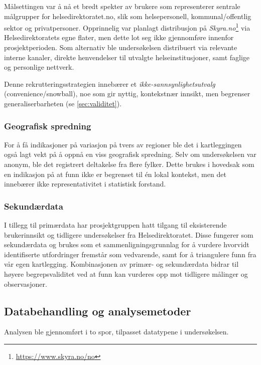 Målsettingen var å nå et bredt spekter av brukere som representerer sentrale målgrupper for helsedirektoratet.no, slik som helsepersonell, kommunal/offentlig sektor og privatpersoner. Opprinnelig var planlagt distribusjon på \textit{Skyra.no}\footnote{\url{https://www.skyra.no/no}} via Helsedirektoratets egne flater, men dette lot seg ikke gjennomføre innenfor prosjektperioden. Som alternativ ble undersøkelsen distribuert via relevante interne kanaler, direkte henvendelser til utvalgte helseinstitusjoner, samt faglige og personlige nettverk.

Denne rekrutteringsstrategien innebærer et \textit{ikke-sannsynlighetsutvalg} (convenience/snowball), noe som gir nyttig, kontekstnær innsikt, men begrenser generaliserbarheten (se \autoref{sec:validitet}).

\subsubsection{Geografisk spredning}
\label{sec:geografi}

For å få indikasjoner på variasjon på tvers av regioner ble det i kartleggingen også lagt vekt på å oppnå en viss geografisk spredning. Selv om undersøkelsen var anonym, ble det registrert deltakelse fra flere fylker. Dette brukes i hovedsak som en indikasjon på at funn ikke er begrenset til én lokal kontekst, men det innebærer ikke representativitet i statistisk forstand.

\subsubsection{Sekundærdata}
\label{sec:sekundaerdata}

I tillegg til primærdata har prosjektgruppen hatt tilgang til eksisterende brukerinnsikt og tidligere undersøkelser fra Helsedirektoratet. Disse fungerer som sekundærdata og brukes som et sammenligningsgrunnlag for å vurdere hvorvidt identifiserte utfordringer fremstår som vedvarende, samt for å triangulere funn fra vår egen kartlegging. Kombinasjonen av primær- og sekundærdata bidrar til høyere begrepsvaliditet ved at funn kan vurderes opp mot tidligere målinger og observasjoner.

\subsection{Databehandling og analysemetoder}
\label{sec:analyse}

Analysen ble gjennomført i to spor, tilpasset datatypene i undersøkelsen.

